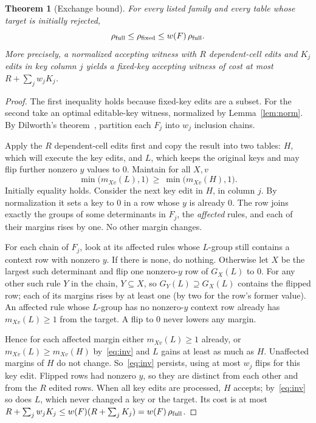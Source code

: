 \documentclass[11pt]{article}
\newtheorem{theorem}{Theorem}
\theoremstyle{remark}
\newcommand{\rfull}{\rho_{\rm full}}
\newcommand{\rfix}{\rho_{\rm fixed}}
\begin{document}
\begin{theorem}[Exchange bound]\label{thm:exchange}
For every listed family and every table whose target is initially rejected,
\[
 \rfull\le\rfix\le w(F)\,\rfull.
\]
More precisely, a normalized accepting witness with $R$ dependent-cell edits
and $K_j$ edits in key column $j$ yields a fixed-key accepting witness of cost
at most $R+\sum_j w_jK_j$.
\end{theorem}
\begin{proof}
The first inequality holds because fixed-key edits are a subset. For the second
take an optimal editable-key witness, normalized by Lemma~\ref{lem:norm}. By
Dilworth's theorem~\cite[Theorem 1.1]{dilworth}, partition each $F_j$ into $w_j$
inclusion chains.

Apply the $R$ dependent-cell edits first and copy the result into two tables:
$H$, which will execute the key edits, and $L$, which keeps the original keys
and may flip further nonzero $y$ values to $0$. Maintain for all $X,v$
\begin{equation}\label{eq:inv}
 \min\bigl(m_{Xv}(L),1\bigr)\ \ge\ \min\bigl(m_{Xv}(H),1\bigr).
\end{equation}
Initially equality holds. Consider the next key edit in $H$, in column $j$. By
normalization it sets a key to $0$ in a row whose $y$ is already $0$. The row
joins exactly the groups of some determinants in $F_j$, the \emph{affected}
rules, and each of their margins rises by one. No other margin changes.

For each chain of $F_j$, look at its affected rules whose $L$-group still
contains a context row with nonzero $y$. If there is none, do nothing.
Otherwise let $X$ be the largest such determinant and flip one nonzero-$y$ row
of $G_X(L)$ to $0$. For any other such rule $Y$ in the chain, $Y\subseteq X$,
so $G_Y(L)\supseteq G_X(L)$ contains the flipped row; each of its margins
rises by at least one (by two for the row's former value). An affected rule
whose $L$-group has no nonzero-$y$ context row already has $m_{Xv}(L)\ge1$ from
the target. A flip to $0$ never lowers any margin.

Hence for each affected margin either $m_{Xv}(L)\ge1$ already, or
$m_{Xv}(L)\ge m_{Xv}(H)$ by~\eqref{eq:inv} and $L$ gains at least as much as
$H$. Unaffected margins of $H$ do not change. So~\eqref{eq:inv} persists, using
at most $w_j$ flips for this key edit. Flipped rows had nonzero $y$, so they are
distinct from each other and from the $R$ edited rows. When all key edits are
processed, $H$ accepts; by~\eqref{eq:inv} so does $L$, which never changed a key
or the target. Its cost is at most
$R+\sum_jw_jK_j\le w(F)(R+\sum_jK_j)=w(F)\,\rfull$.
\end{proof}
\end{document}
